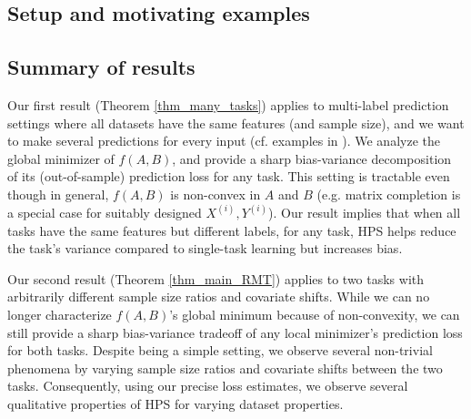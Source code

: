 \subsection{Setup and motivating examples}\label{sec_HPS_loss}

\subsection{Summary of results}

Our first result (Theorem \ref{thm_many_tasks}) applies to multi-label prediction settings where all datasets have the same features (and sample size), and we want to make several predictions for every input (cf. examples in \cite{hsu2009multi}).
We analyze the global minimizer of $f(A, B)$, and provide a sharp bias-variance decomposition of its (out-of-sample) prediction loss for any task.
This setting is tractable even though in general, $f(A, B)$ is non-convex in $A$ and $B$ (e.g. matrix completion is a special case for suitably designed $X^{(i)}, Y^{(i)}$).
Our result implies that when all tasks have the same features but different labels, for any task, HPS helps reduce the task's variance compared to single-task learning but increases bias.

Our second result (Theorem \ref{thm_main_RMT}) applies to two tasks with arbitrarily different sample size ratios and covariate shifts.
While we can no longer characterize $f(A, B)$'s global minimum because of non-convexity, we can still provide a sharp bias-variance tradeoff of any local minimizer's prediction loss for both tasks.
Despite being a simple setting, we observe several non-trivial phenomena by varying sample size ratios and covariate shifts between the two tasks.
Consequently, using our precise loss estimates, we observe several qualitative properties of HPS for varying dataset properties.

